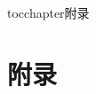 
\newenvironment{theappendix}{\wuhao\song}

\addcontentsline{toc}{chapter}{附录}%
\chapter*{\centering\xiaosan\hei\bfseries 附\quad 录}

\begin{theappendix}


\end{theappendix}

